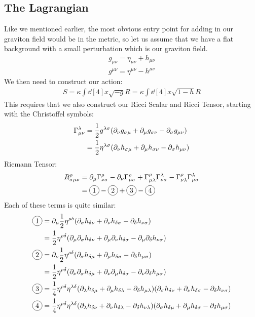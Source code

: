 \documentclass[12pt]{article}
\newcommand{\D}{\partial}
\newcommand{\ddst}{\dd[4]{x}}
\newcommand{\munu}{{\mu\nu}}
\newcommand*{\circd}[1]{\tikz[baseline=(char.base)]{
    \node[shape=circle,draw,inner sep=2pt] (char) {#1};}}
\begin{document}
\subsection{The Lagrangian}
Like we mentioned earlier, the most obvious entry point for adding in our graviton field would be in the metric, so let us assume that we have a flat background with a small perturbation which is our graviton field. 
\begin{align*}
  g_\munu=\eta_\munu+h_\munu\\
  g^\munu=\eta^\munu-h^\munu
\end{align*}
We then need to construct our action:
\begin{align*}
  S=\kappa\int\ddst\sqrt{-g}R=\kappa\int\ddst\sqrt{1-h}R
\end{align*}
This requires that we also construct our Ricci Scalar and Ricci Tensor, starting with the Christoffel symbols:
\begin{align*}
  \Gamma^\lambda_\munu&=\frac{1}{2}g^{\lambda\sigma}
  \qty(\D_\nu g_{\sigma\mu}+\D_\mu g_{\sigma\nu}-\D_\sigma g_{\munu})\\
  &=\frac{1}{2}\eta^{\lambda\sigma}
  \qty(\D_\nu h_{\sigma\mu}+\D_\mu h_{\sigma\nu}-\D_\sigma h_{\munu})
\end{align*}
Riemann Tensor:
\begin{align*}
  R^\rho_{\sigma\munu}&=\D_\mu\Gamma^\rho_{\nu\sigma}
  -\D_\nu\Gamma^\rho_{\mu\sigma}
  +\Gamma^\rho_{\mu\lambda}\Gamma^\lambda_{\nu\sigma}
  -\Gamma^{\rho}_{\nu\lambda}\Gamma^{\lambda}_{\mu\sigma}\\
  &=\circd{1}-\circd{2}+\circd{3}-\circd{4}
\end{align*}
Each of these terms is quite similar:
\begin{align*}
  \circd1&=\D_\mu\frac{1}{2}\eta^{\rho\delta}
  \qty(\D_\sigma h_{\delta\nu}+\D_\nu h_{\delta\sigma}-\D_\delta h_{\nu\sigma})\\
  &=\frac{1}{2}\eta^{\rho\delta}
  \qty(\D_\mu\D_\sigma h_{\delta\nu}+\D_\mu\D_\nu h_{\delta\sigma}
  -\D_\mu\D_\delta h_{\nu\sigma})\\
  \circd2&=\D_\nu\frac{1}{2}\eta^{\rho\delta}
  \qty(\D_\sigma h_{\delta\mu}+\D_\mu h_{\delta\sigma}-\D_\delta h_{\mu\sigma})\\
  &=\frac{1}{2}\eta^{\rho\delta}
  \qty(\D_\nu\D_\sigma h_{\delta\mu}+\D_\nu\D_\mu h_{\delta\sigma}
  -\D_\nu\D_\delta h_{\mu\sigma})\\
  \circd3&=\frac{1}{4}\eta^{\rho\delta}\eta^{\lambda\delta}
  \qty(\D_\lambda h_{\delta\mu}+\D_\mu h_{\delta\lambda}-\D_\delta h_{\mu\lambda})
  \qty(\D_\sigma h_{\delta\nu}+\D_\nu h_{\delta\sigma}-\D_\delta h_{\nu\sigma})\\
  \circd4&=\frac{1}{4}\eta^{\rho\delta}\eta^{\lambda\delta}
  \qty(\D_\lambda h_{\delta\nu}+\D_\nu h_{\delta\lambda}-\D_\delta h_{\nu\lambda})
  \qty(\D_\sigma h_{\delta\mu}+\D_\mu h_{\delta\sigma}-\D_\delta h_{\mu\sigma})
\end{align*}
\end{document}
